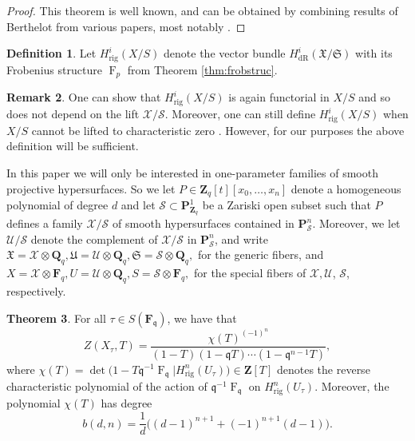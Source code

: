\documentclass[a4paper,11pt]{article}
\numberwithin{equation}{section}
\newcommand{\ZZ}{\mathbf{Z}} %
\newcommand{\QQ}{\mathbf{Q}} %
\newcommand{\FF}{\mathbf{F}} %
\DeclareMathOperator{\Frob}{F}           %
\providecommand{\HdR}{H_{\text{dR}}}    %
\providecommand{\Hrig}{H_{\text{rig}}}  %
\theoremstyle{definition}
\newtheorem{thm}{Theorem}[section]
\newtheorem{defn}[thm]{Definition}
\newtheorem{rem}[thm]{Remark}
\begin{document}
\begin{proof}
This theorem is well known, and can be obtained by combining results of 
Berthelot from various papers, most notably \cite{Berthelot1986}.   
\end{proof}

\begin{defn}
Let $\Hrig^i(X/S)$ denote the vector bundle $\HdR^i(\mathfrak{X}/\mathfrak{S})$ with its Frobenius
structure $\Frob_p$ from Theorem \ref{thm:frobstruc}.
\end{defn}

\begin{rem}
One can show that $\Hrig^i(X/S)$ is again functorial in $X/S$ and so does not depend on the lift $\mathcal{X}/\mathcal{S}$. 
Moreover, one can still define $\Hrig^i(X/S)$ when $X/S$ cannot be lifted to characteristic zero \cite{Berthelot1986}.
However, for our purposes the above definition will be sufficient.
\end{rem}

In this paper we will only be interested in one-parameter families of smooth projective hypersurfaces. 
So we let $P \in \ZZ_q[t][x_0,\ldots,x_n]$ denote a homogeneous polynomial of degree $d$ and let 
$\mathcal{S} \subset \mathbf{P}^1_{\ZZ_q}$ be a Zariski open subset such that $P$ defines a family  
$\mathcal{X}/\mathcal{S}$ of smooth hypersurfaces contained in $\mathbf{P}^n_{\mathcal{S}}$. Moreover, we let
$\mathcal{U}/\mathcal{S}$ denote the complement of $\mathcal{X}/\mathcal{S}$ in $\mathbf{P}^n_{\mathcal{S}}$,
and write 
$\mathfrak{X}=\mathcal{X} \otimes \QQ_q, \mathfrak{U}=\mathcal{U} \otimes \QQ_q, \mathfrak{S}=\mathcal{S} \otimes \QQ_q,$
for the generic fibers, and
$X=\mathcal{X} \otimes \FF_q, U=\mathcal{U} \otimes \QQ_q, S=\mathcal{S} \otimes \FF_q,$
for the special fibers of $\mathcal{X},\mathcal{U}$, $\mathcal{S}$, respectively.

\begin{thm} \label{thm:hypersurface} For all $\tau \in S(\FF_{\mathfrak{q}})$, we have that
\begin{equation} \label{eq:formulazeta}
Z(X_{\tau},T) = \frac{\chi(T)^{(-1)^n}}{(1 - T) (1 - \mathfrak{q}T) \dotsm (1 - \mathfrak{q}^{n-1}T)},
\end{equation}
where 
$\chi(T) = \det \bigl( 1 - T \mathfrak{q}^{-1} \Frob_{\mathfrak{q}} | \Hrig^n(U_{\tau}) \bigr) \in \ZZ[T]$
denotes the reverse characteristic polynomial of the action of $\mathfrak{q}^{-1} \Frob_{\mathfrak{q}}$ 
on $\Hrig^n(U_{\tau})$. Moreover, the polynomial $\chi(T)$ has degree 
\begin{equation} \label{eq:formulab}
b(d,n)=\frac{1}{d} \bigl((d-1)^{n+1} + (-1)^{n+1}(d-1) \bigr).
\end{equation}
\end{thm}
\end{document}
